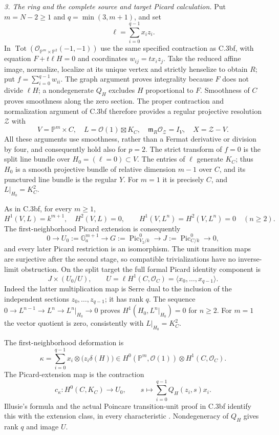 \emph{3. The ring and the complete source and target Picard calculation.}
Put $m=N-2\ge1$ and $q=\min(3,m+1)$, and set
\[
 \ell=\sum_{i=0}^{q-1}x_i z_i.
\]
In $\operatorname{Tot}(\mathcal O_{\mathbb P^m\times\mathbb P^2}(-1,-1))$
use the same specified contraction as C.3bf, with equation
$F+t\ell H=0$ and coordinates $w_{ij}=tx_i z_j$. Take the reduced
affine image, normalize, localize at its unique vertex and strictly
henselize to obtain $R$; put $f=\sum_{i=0}^{q-1}w_{ii}$.
The graph argument proves integrality because $F$ does not divide
$\ell H$; a nondegenerate $Q_H$ excludes $H$ proportional to $F$.
Smoothness of $C$ proves smoothness along the zero section. The
proper contraction and normalization argument of C.3bf therefore
provides a regular projective resolution $\mathcal Z$ with
\[
 V=\mathbb P^m\times C,\quad
 L=\mathcal O(1)\boxtimes K_C,\quad
 \mathfrak m_R\mathcal O_{\mathcal Z}=I_V,\quad X=\mathcal Z-V.
\]
All these arguments use smoothness, rather than a Fermat derivative
or division by four, and consequently hold also for $p=2$.
The strict transform of $f=0$ is the split line bundle over
$H_0=(\ell=0)\subset V$. The entries of $\ell$ generate $K_C$;
thus $H_0$ is a smooth projective bundle of relative dimension $m-1$
over $C$, and its punctured line bundle is the regular $Y$.
For $m=1$ it is precisely $C$, and $L|_{H_0}=K_C^2$.

As in C.3bf, for every $m\ge1$,
\[
 H^1(V,L)=k^{m+1},\quad H^2(V,L)=0,\qquad
 H^1(V,L^n)=H^2(V,L^n)=0\quad(n\ge2).
\]
The first-neighborhood Picard extension is consequently
\[
 0\longrightarrow U_0:=\mathbb G_a^{m+1}
 \longrightarrow G:=\operatorname{Pic}^0_{V_2/k}
 \longrightarrow J:=\operatorname{Pic}^0_{C/k}\longrightarrow0,
\]
and every later Picard restriction is an isomorphism. The unit
transition maps are surjective after the second stage, so compatible
trivializations have no inverse-limit obstruction.
On the split target the full formal Picard identity component is
\[
 J\times(U_0/U),\qquad
 U=\ell H^1(C,\mathcal O_C)=\langle x_0,\ldots,x_{q-1}\rangle.
\]
Indeed the latter multiplication map is Serre dual to the inclusion
of the independent sections $z_0,\ldots,z_{q-1}$; it has rank $q$.
The sequence $0\to L^{n-1}\to L^n\to L^n|_{H_0}\to0$ proves
$H^1(H_0,L^n|_{H_0})=0$ for $n\ge2$. For $m=1$ the vector quotient
is zero, consistently with $L|_{H_0}=K_C^2$.

The first-neighborhood deformation is
\[
 \kappa=\sum_{i=0}^{q-1}x_i\otimes
             \bigl(z_i\delta(H)\bigr)
 \in H^0(\mathbb P^m,\mathcal O(1))\otimes H^1(C,\mathcal O_C).
\]
The Picard-extension map is the contraction
\[
 c_\kappa:H^0(C,K_C)\longrightarrow U_0,
 \qquad s\longmapsto\sum_{i=0}^{q-1}Q_H(z_i,s)x_i.
\]
Illusie's formula and the actual Poincare transition-unit proof in
C.3bf identify this with the extension class, in every characteristic
\citep[Theorem2.6 and formula(2.7.2), pp.~166--167]{D_Illusie1972Torsors}.
Nondegeneracy of $Q_H$ gives rank $q$ and image $U$.

